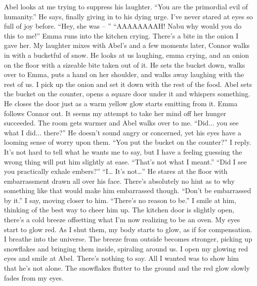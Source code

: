 \documentclass[openany, 12pt]{book}
\newcommand\tab[1][1cm]{\hspace*{#1}}
\begin{document}
\newline
\tab
Abel looks at me trying to suppress his laughter. ``You are the primordial evil of humanity.'' He says, finally giving in to his dying urge. I’ve never stared at eyes so full of joy before.
\newline
\tab
``Hey, she was -- ''
\newline
\tab
``AAAAAAAAH! Nabu why would you do this to me!'' Emma runs into the kitchen crying. There’s a bite in the onion I gave her. My laughter mixes with Abel’s and a few moments later, Connor walks in with a bucketful of snow. He looks at us laughing, emma crying, and an onion on the floor with a sizeable bite taken out of it. He sets the bucket down, walks over to Emma, puts a hand on her shoulder, and walks away laughing with the rest of us.
\newline
\tab
I pick up the onion and set it down with the rest of the food. Abel sets the bucket on the counter, opens a square door under it and whispers something. He closes the door just as a warm yellow glow starts emitting from it. Emma follows Connor out. It seems my attempt to take her mind off her hunger succeeded. The room gets warmer and Abel walks over to me. ``Did... you see what I did... there?'' He doesn’t sound angry or concerned, yet his eyes have a looming sense of worry upon them.
\newline
\tab
``You put the bucket on the counter?'' I reply. It’s not hard to tell what he wants me to say, but I have a feeling guessing the wrong thing will put him slightly at ease.
\newline
\tab
``That’s not what I meant.''
\newline
\tab
``Did I see you practically exhale embers?''
\newline
\tab
``I… It’s not…'' He stares at the floor with embarrassment drawn all over his face. There’s absolutely no hint as to why something like that would make him embarrassed though.
\newline
\tab
``Don’t be embarrassed by it.'' I say, moving closer to him. ``There’s no reason to be.'' I smile at him, thinking of the best way to cheer him up. The kitchen door is slightly open, there’s a cold breeze offsetting what I’m now realizing to be an oven. 
\newline
\tab
My eyes start to glow red. As I shut them, my body starts to glow, as if for compensation. I breathe into the universe. The breeze from outside becomes stronger, picking up snowflakes and bringing them inside, spiraling around us. I open my glowing red eyes and smile at Abel. There’s nothing to say. All I wanted was to show him that he’s not alone. The snowflakes flutter to the ground and the red glow slowly fades from my eyes.
\end{document}
